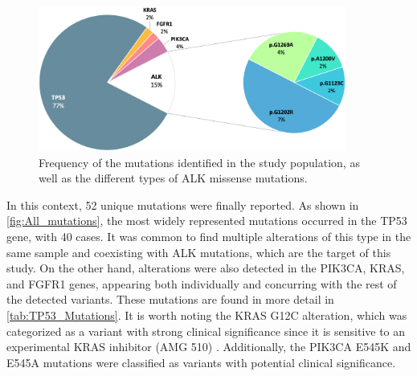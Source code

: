 \begin{figure}[ht]
    \centering
    \includegraphics[width=0.9\textwidth]{Images/chapter_4/all_mutations.png}
    \caption{Frequency of the mutations identified in the study population, as well as the different types of ALK missense mutations.}
    \label{fig:All_mutations}
\end{figure}

In this context, 52 unique mutations were finally reported. As shown in \autoref{fig:All_mutations}, the most widely represented mutations occurred in the TP53 gene, with 40 cases. It was common to find multiple alterations of this type in the same sample and coexisting with ALK mutations, which are the target of this study. On the other hand, alterations were also detected in the PIK3CA, KRAS, and FGFR1 genes, appearing both individually and concurring with the rest of the detected variants. These mutations are found in more detail in \autoref{tab:TP53_Mutations}. It is worth noting the KRAS G12C alteration, which was categorized as a variant with strong clinical significance since it is sensitive to an experimental KRAS inhibitor (AMG 510) \cite{KRAS_inhib}. Additionally, the PIK3CA E545K and E545A mutations were classified as variants with potential clinical significance.

